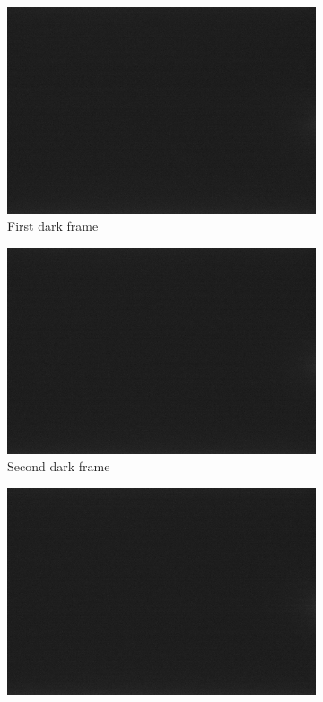 {\begin{figure}[h]
\captionsetup[subfigure]{justification=centering}
\captionsetup{justification=centering}
    \centering
	\begin{subfigure}{0.49\textwidth}
		\includegraphics[width=1\linewidth]{appendix/img/campaign_results/d0.jpeg}
		\caption{First dark frame}
		\label{fig:sub:d0}
	\end{subfigure}
	\begin{subfigure}{0.49\textwidth}
		\includegraphics[width=1\linewidth]{appendix/img/campaign_results/d1.jpeg}
		\caption{Second dark frame}
		\label{fig:sub:d1}
	\end{subfigure}
	\begin{subfigure}{0.49\textwidth}
		\includegraphics[width=1\linewidth]{appendix/img/campaign_results/d2.jpeg}

\end{subfigure}
\end{figure}}
